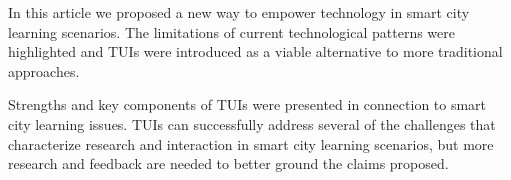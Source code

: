 In this article we proposed a new way to empower technology in smart city learning scenarios. The limitations of current technological patterns were highlighted and TUIs were introduced as a viable alternative to more traditional approaches.

Strengths and key components of TUIs were presented in connection to smart city learning issues.
TUIs can successfully address several of the challenges that characterize research and interaction in smart city learning scenarios, but more research and feedback are needed to better ground the claims proposed.